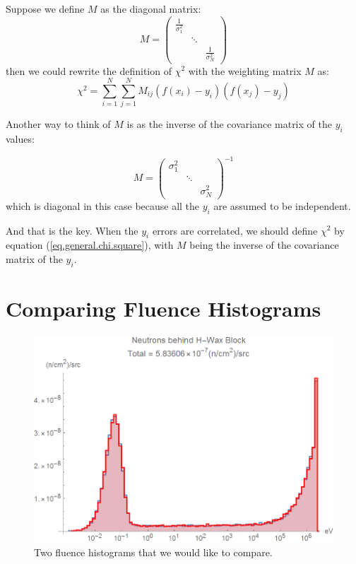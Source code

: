 \documentclass[letterpaper,12pt]{article}
\newcommand{\myMatrix}[1]{\bm{\mathit{#1}}}
\begin{document}
Suppose we define $\myMatrix{M}$ as the diagonal matrix:
\begin{equation}
\myMatrix{M}=
\begin{pmatrix}
\frac{1}{\sigma_1^2} & & \\
& \ddots & \\
& & \frac{1}{\sigma_N^2}
\end{pmatrix}
\end{equation}
then we could rewrite the definition of $\chi^2$ with the weighting matrix $\myMatrix{M}$ as:
\begin{equation} \label{eq.general.chi.square}
\chi^2=\sum_{i=1}^N \sum_{j=1}^N \myMatrix{M}_{ij}(f(x_i) - y_i)(f(x_j) - y_j)
\end{equation}

Another way to think of $\myMatrix{M}$ is as the inverse of the covariance matrix of the $y_i$ values:

\begin{equation}
\myMatrix{M}=
\begin{pmatrix}
\sigma_1^2 & & \\
& \ddots & \\
& & \sigma_N^2
\end{pmatrix}^{-1}
\end{equation}
which is diagonal in this case because all the $y_i$ are assumed to be independent.

And that is the key. When the $y_i$ errors are correlated, we should define $\chi^2$ by equation (\ref{eq.general.chi.square}), with $\myMatrix{M}$ being the inverse of the covariance matrix of the $y_i$.

\section{Comparing Fluence Histograms}

\begin{figure}[ht] 
\centering	\includegraphics[width=0.7\columnwidth]{sn2304}
	\caption{
		\label{fig.fluence}
		Two fluence histograms that we would like to compare.
	}
\end{figure}
\end{document}
